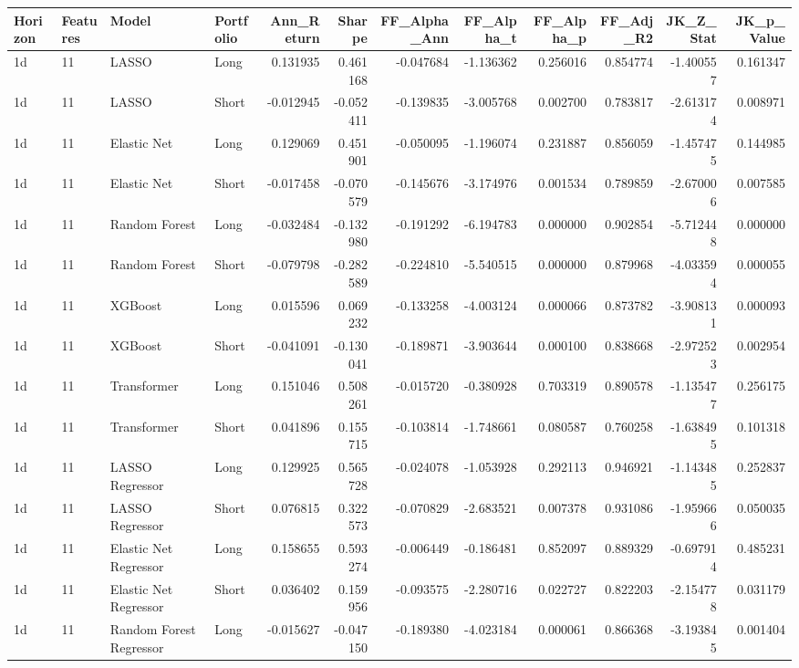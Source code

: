 \begin{tabular}{llllrrrrrrrr}
\toprule
Horizon & Features & Model & Portfolio & Ann_Return & Sharpe & FF_Alpha_Ann & FF_Alpha_t & FF_Alpha_p & FF_Adj_R2 & JK_Z_Stat & JK_p_Value \\
\midrule
1d & 11 & LASSO & Long & 0.131935 & 0.461168 & -0.047684 & -1.136362 & 0.256016 & 0.854774 & -1.400557 & 0.161347 \\
1d & 11 & LASSO & Short & -0.012945 & -0.052411 & -0.139835 & -3.005768 & 0.002700 & 0.783817 & -2.613174 & 0.008971 \\
1d & 11 & Elastic Net & Long & 0.129069 & 0.451901 & -0.050095 & -1.196074 & 0.231887 & 0.856059 & -1.457475 & 0.144985 \\
1d & 11 & Elastic Net & Short & -0.017458 & -0.070579 & -0.145676 & -3.174976 & 0.001534 & 0.789859 & -2.670006 & 0.007585 \\
1d & 11 & Random Forest & Long & -0.032484 & -0.132980 & -0.191292 & -6.194783 & 0.000000 & 0.902854 & -5.712448 & 0.000000 \\
1d & 11 & Random Forest & Short & -0.079798 & -0.282589 & -0.224810 & -5.540515 & 0.000000 & 0.879968 & -4.033594 & 0.000055 \\
1d & 11 & XGBoost & Long & 0.015596 & 0.069232 & -0.133258 & -4.003124 & 0.000066 & 0.873782 & -3.908131 & 0.000093 \\
1d & 11 & XGBoost & Short & -0.041091 & -0.130041 & -0.189871 & -3.903644 & 0.000100 & 0.838668 & -2.972523 & 0.002954 \\
1d & 11 & Transformer & Long & 0.151046 & 0.508261 & -0.015720 & -0.380928 & 0.703319 & 0.890578 & -1.135477 & 0.256175 \\
1d & 11 & Transformer & Short & 0.041896 & 0.155715 & -0.103814 & -1.748661 & 0.080587 & 0.760258 & -1.638495 & 0.101318 \\
1d & 11 & LASSO Regressor & Long & 0.129925 & 0.565728 & -0.024078 & -1.053928 & 0.292113 & 0.946921 & -1.143485 & 0.252837 \\
1d & 11 & LASSO Regressor & Short & 0.076815 & 0.322573 & -0.070829 & -2.683521 & 0.007378 & 0.931086 & -1.959666 & 0.050035 \\
1d & 11 & Elastic Net Regressor & Long & 0.158655 & 0.593274 & -0.006449 & -0.186481 & 0.852097 & 0.889329 & -0.697914 & 0.485231 \\
1d & 11 & Elastic Net Regressor & Short & 0.036402 & 0.159956 & -0.093575 & -2.280716 & 0.022727 & 0.822203 & -2.154778 & 0.031179 \\
1d & 11 & Random Forest Regressor & Long & -0.015627 & -0.047150 & -0.189380 & -4.023184 & 0.000061 & 0.866368 & -3.193845 & 0.001404 \\

\end{tabular}
